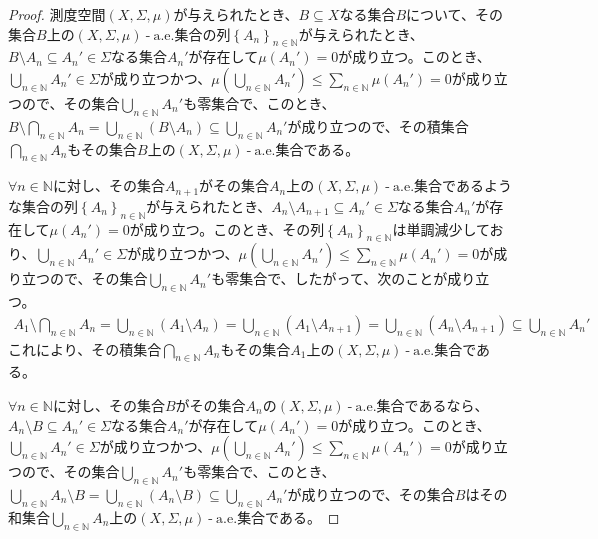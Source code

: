 \documentclass[dvipdfmx]{jsarticle}
\begin{document}
\begin{proof}
測度空間$(X,\varSigma,\mu)$が与えられたとき、$B \subseteq X$なる集合$B$について、その集合$B$上の$(X,\varSigma,\mu) \ \text{-} \ \mathrm{a.e.}$集合の列$\left\{ A_{n} \right\}_{n \in \mathbb{N}}$が与えられたとき、$B \setminus A_{n} \subseteq A_{n}' \in \varSigma$なる集合$A_{n}'$が存在して$\mu\left( A_{n}' \right) = 0$が成り立つ。このとき、$\bigcup_{n \in \mathbb{N}} A_{n}' \in \varSigma$が成り立つかつ、$\mu\left( \bigcup_{n \in \mathbb{N}} A_{n}' \right) \leq \sum_{n \in \mathbb{N}} {\mu\left( A_{n}' \right)} = 0$が成り立つので、その集合$\bigcup_{n \in \mathbb{N}} A_{n}'$も零集合で、このとき、$B \setminus \bigcap_{n \in \mathbb{N}} A_{n} = \bigcup_{n \in \mathbb{N}} \left( B \setminus A_{n} \right) \subseteq \bigcup_{n \in \mathbb{N}} A_{n}'$が成り立つので、その積集合$\bigcap_{n \in \mathbb{N}} A_{n}$もその集合$B$上の$(X,\varSigma,\mu) \ \text{-} \ \mathrm{a.e.}$集合である。\par
$\forall n \in \mathbb{N}$に対し、その集合$A_{n + 1}$がその集合$A_{n}$上の$(X,\varSigma,\mu) \ \text{-} \ \mathrm{a.e.}$集合であるような集合の列$\left\{ A_{n} \right\}_{n \in \mathbb{N}}$が与えられたとき、$A_{n} \setminus A_{n + 1} \subseteq A_{n}' \in \varSigma$なる集合$A_{n}'$が存在して$\mu\left( A_{n}' \right) = 0$が成り立つ。このとき、その列$\left\{ A_{n} \right\}_{n \in \mathbb{N}}$は単調減少しており、$\bigcup_{n \in \mathbb{N}} A_{n}' \in \varSigma$が成り立つかつ、$\mu\left( \bigcup_{n \in \mathbb{N}} A_{n}' \right) \leq \sum_{n \in \mathbb{N}} {\mu\left( A_{n}' \right)} = 0$が成り立つので、その集合$\bigcup_{n \in \mathbb{N}} A_{n}'$も零集合で、したがって、次のことが成り立つ。
\begin{align*}
A_{1} \setminus \bigcap_{n \in \mathbb{N}} A_{n} = \bigcup_{n \in \mathbb{N}} \left( A_{1} \setminus A_{n} \right) = \bigcup_{n \in \mathbb{N}} \left( A_{1} \setminus A_{n + 1} \right) = \bigcup_{n \in \mathbb{N}} \left( A_{n} \setminus A_{n + 1} \right) \subseteq \bigcup_{n \in \mathbb{N}} A_{n}'
\end{align*}
これにより、その積集合$\bigcap_{n \in \mathbb{N}} A_{n}$もその集合$A_{1}$上の$(X,\varSigma,\mu) \ \text{-} \ \mathrm{a.e.}$集合である。\par
$\forall n \in \mathbb{N}$に対し、その集合$B$がその集合$A_{n}$の$(X,\varSigma,\mu) \ \text{-} \ \mathrm{a.e.}$集合であるなら、$A_{n} \setminus B \subseteq A_{n}' \in \varSigma$なる集合$A_{n}'$が存在して$\mu\left( A_{n}' \right) = 0$が成り立つ。このとき、$\bigcup_{n \in \mathbb{N}} A_{n}' \in \varSigma$が成り立つかつ、$\mu\left( \bigcup_{n \in \mathbb{N}} A_{n}' \right) \leq \sum_{n \in \mathbb{N}} {\mu\left( A_{n}' \right)} = 0$が成り立つので、その集合$\bigcup_{n \in \mathbb{N}} A_{n}'$も零集合で、このとき、$\bigcup_{n \in \mathbb{N}} A_{n} \setminus B = \bigcup_{n \in \mathbb{N}} \left( A_{n} \setminus B \right) \subseteq \bigcup_{n \in \mathbb{N}} A_{n}'$が成り立つので、その集合$B$はその和集合$\bigcup_{n \in \mathbb{N}} A_{n}$上の$(X,\varSigma,\mu) \ \text{-} \ \mathrm{a.e.}$集合である。
\end{proof}
\end{document}
